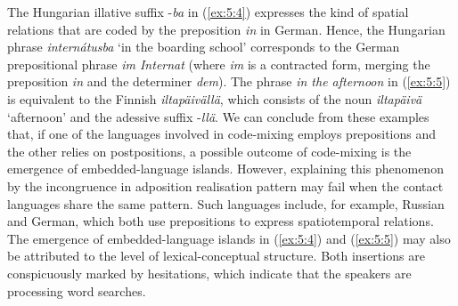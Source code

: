 \noindent The Hungarian illative suffix -\textit{ba} in (\ref{ex:5:4}) expresses the kind of spatial relations that are coded by the preposition \textit{in} in German. Hence, the Hungarian phrase \textit{internátusba} `in the boarding school' corresponds to the German  prepositional phrase \textit{im Internat} (where \textit{im} is a contracted form, merging the preposition \textit{in} and the determiner \textit{dem}). The phrase \textit{in the afternoon} in (\ref{ex:5:5}) is equivalent to the Finnish \textit{iltapäivällä}, which consists of the noun \textit{iltapäivä} `afternoon' and the adessive suffix -\textit{llä}. We can conclude from these examples that, if one of the languages involved in code-mixing employs prepositions and the other relies on postpositions, a possible outcome of code-mixing is the emergence of embedded-language islands. However, explaining this phenomenon by the incongruence in adposition realisation pattern may fail when the contact languages share the same pattern. Such languages include, for example, Russian and German, which both use prepositions to express spatiotemporal relations. The emergence of embedded-language islands in (\ref{ex:5:4}) and (\ref{ex:5:5}) may also be attributed to the level of lexical-conceptual structure. Both insertions are conspicuously marked by hesitations, which indicate that the speakers are processing word searches. 

